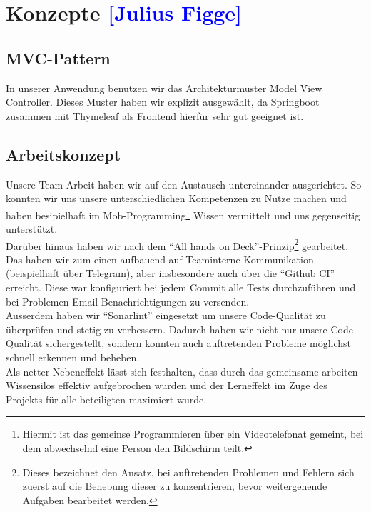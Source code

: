 \section{Konzepte \textcolor{blue}{[Julius Figge]}}

\subsection{MVC-Pattern}
In unserer Anwendung benutzen wir das Architekturmuster Model View Controller.
Dieses Muster haben wir explizit ausgewählt, da Springboot zusammen mit Thymeleaf als Frontend hierfür sehr gut geeignet ist.

\subsection{Arbeitskonzept}%
Unsere Team Arbeit haben wir auf den Austausch untereinander ausgerichtet.
So konnten wir uns unsere unterschiedlichen Kompetenzen zu Nutze machen und haben besipielhaft im Mob-Programming\footnote{Hiermit ist das gemeinse Programmieren über ein Videotelefonat gemeint, bei dem abwechselnd eine Person den Bildschirm teilt.} Wissen vermittelt und uns gegenseitig unterstützt.\\
Darüber hinaus haben wir nach dem \enquote{All hands on Deck}-Prinzip\footnote{Dieses bezeichnet den Ansatz, bei auftretenden Problemen und Fehlern sich zuerst auf die Behebung dieser zu konzentrieren, bevor weitergehende Aufgaben bearbeitet werden.} gearbeitet.\\
Das haben wir zum einen aufbauend auf Teaminterne Kommunikation (beispielhaft über Telegram), aber insbesondere auch über die \enquote{Github CI} erreicht.
Diese war konfiguriert bei jedem Commit alle Tests durchzuführen und bei Problemen Email-Benachrichtigungen zu versenden.\\
Ausserdem haben wir \enquote{Sonarlint} eingesetzt um unsere Code-Qualität zu überprüfen und stetig zu verbessern.
Dadurch haben wir nicht nur unsere Code Qualität sichergestellt, sondern konnten auch auftretenden Probleme möglichst schnell erkennen und beheben.\\
Als netter Nebeneffekt lässt sich festhalten, dass durch das gemeinsame arbeiten Wissensilos effektiv aufgebrochen wurden und der Lerneffekt im Zuge des Projekts für alle beteiligten maximiert wurde.


